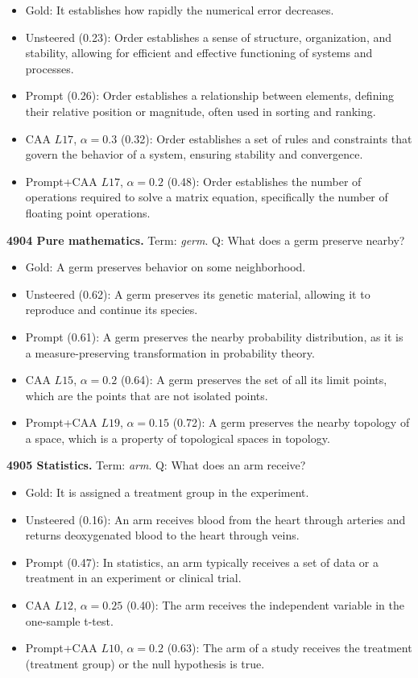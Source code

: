 \begin{itemize}\setlength{\itemsep}{0.15em}\setlength{\parsep}{0pt}\setlength{\topsep}{0.2em}
\item Gold: It establishes how rapidly the numerical error decreases.
\item Unsteered (0.23): Order establishes a sense of structure, organization, and stability, allowing for efficient and effective functioning of systems and processes.
\item Prompt (0.26): Order establishes a relationship between elements, defining their relative position or magnitude, often used in sorting and ranking.
\item CAA $L17$, $\alpha=0.3$ (0.32): Order establishes a set of rules and constraints that govern the behavior of a system, ensuring stability and convergence.
\item Prompt+CAA $L17$, $\alpha=0.2$ (0.48): Order establishes the number of operations required to solve a matrix equation, specifically the number of floating point operations.
\end{itemize}
\medskip\noindent\textbf{4904 Pure mathematics.} Term: \emph{germ}.
Q: What does a germ preserve nearby?
\begin{itemize}\setlength{\itemsep}{0.15em}\setlength{\parsep}{0pt}\setlength{\topsep}{0.2em}
\item Gold: A germ preserves behavior on some neighborhood.
\item Unsteered (0.62): A germ preserves its genetic material, allowing it to reproduce and continue its species.
\item Prompt (0.61): A germ preserves the nearby probability distribution, as it is a measure-preserving transformation in probability theory.
\item CAA $L15$, $\alpha=0.2$ (0.64): A germ preserves the set of all its limit points, which are the points that are not isolated points.
\item Prompt+CAA $L19$, $\alpha=0.15$ (0.72): A germ preserves the nearby topology of a space, which is a property of topological spaces in topology.
\end{itemize}
\medskip\noindent\textbf{4905 Statistics.} Term: \emph{arm}.
Q: What does an arm receive?
\begin{itemize}\setlength{\itemsep}{0.15em}\setlength{\parsep}{0pt}\setlength{\topsep}{0.2em}
\item Gold: It is assigned a treatment group in the experiment.
\item Unsteered (0.16): An arm receives blood from the heart through arteries and returns deoxygenated blood to the heart through veins.
\item Prompt (0.47): In statistics, an arm typically receives a set of data or a treatment in an experiment or clinical trial.
\item CAA $L12$, $\alpha=0.25$ (0.40): The arm receives the independent variable in the one-sample t-test.
\item Prompt+CAA $L10$, $\alpha=0.2$ (0.63): The arm of a study receives the treatment (treatment group) or the null hypothesis is true.
\end{itemize}
